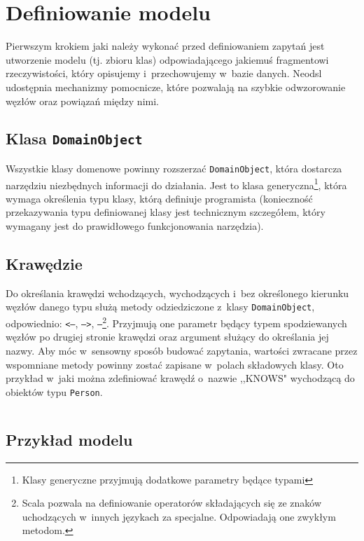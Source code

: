 \documentclass{xmgr}
\begin{document}
\section{Definiowanie modelu}

Pierwszym krokiem jaki należy wykonać przed definiowaniem zapytań jest utworzenie modelu (tj. zbioru klas) odpowiadającego jakiemuś fragmentowi rzeczywistości, który opisujemy i~przechowujemy w~bazie danych. Neodsl udostępnia mechanizmy pomocnicze, które pozwalają na szybkie odwzorowanie węzłów oraz powiązań między nimi.

\newpage

\subsection{Klasa \texttt{DomainObject}}

Wszystkie klasy domenowe powinny rozszerzać \texttt{DomainObject}, która dostarcza narzędziu niezbędnych informacji do działania. Jest to klasa generyczna\footnote{Klasy generyczne  przyjmują dodatkowe parametry będące typami}, która wymaga określenia typu klasy, którą definiuje programista (konieczność przekazywania typu definiowanej klasy jest technicznym szczegółem, który wymagany jest do prawidłowego funkcjonowania narzędzia). 

\subsection{Krawędzie}

Do określania krawędzi wchodzących, wychodzących i~bez określonego kierunku węzłów danego typu służą metody odziedziczone z~klasy \texttt{DomainObject}, odpowiednio:  \texttt{<--}, \texttt{-->}, \texttt{--}\footnote{Scala pozwala na definiowanie operatorów składających się ze znaków uchodzących w~innych językach za specjalne. Odpowiadają one zwykłym metodom.}. Przyjmują one parametr będący typem spodziewanych węzłów po drugiej stronie krawędzi oraz argument służący do określania jej nazwy. Aby móc w~sensowny sposób budować zapytania, wartości zwracane przez wspomniane metody powinny zostać zapisane w~polach składowych klasy. Oto przykład w~jaki można zdefiniować krawędź o~nazwie ,,KNOWS" wychodzącą do obiektów typu \texttt{Person}.

\inputminted{scala}{listings/scala/dsl/simple-relation.scala}

\subsection{Przykład modelu}
\end{document}
